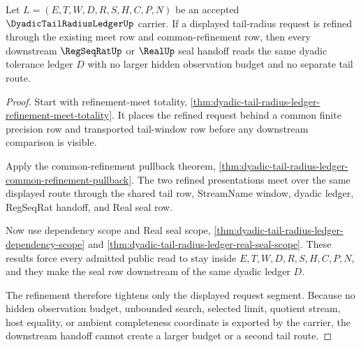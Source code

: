 \begin{theorem}
\label{thm:dyadic-tail-radius-ledger-budget-monotonicity}
Let $L=(E,T,W,D,R,S,H,C,P,N)$ be an accepted $\DyadicTailRadiusLedgerUp$ carrier. If a displayed tail-radius request is refined through the existing meet row and common-refinement row, then every downstream $\RegSeqRatUp$ or $\RealUp$ seal handoff reads the same dyadic tolerance ledger $D$ with no larger hidden observation budget and no separate tail route.
\end{theorem}
\begin{proof}
Start with refinement-meet totality, \autoref{thm:dyadic-tail-radius-ledger-refinement-meet-totality}. It places the refined request behind a common finite precision row and transported tail-window row before any downstream comparison is visible.

Apply the common-refinement pullback theorem, \autoref{thm:dyadic-tail-radius-ledger-common-refinement-pullback}. The two refined presentations meet over the same displayed route through the shared tail row, StreamName window, dyadic ledger, RegSeqRat handoff, and Real seal row.

Now use dependency scope and Real seal scope, \autoref{thm:dyadic-tail-radius-ledger-dependency-scope} and \autoref{thm:dyadic-tail-radius-ledger-real-seal-scope}. These results force every admitted public read to stay inside $E,T,W,D,R,S,H,C,P,N$, and they make the seal row downstream of the same dyadic ledger $D$.

The refinement therefore tightens only the displayed request segment. Because no hidden observation budget, unbounded search, selected limit, quotient stream, host equality, or ambient completeness coordinate is exported by the carrier, the downstream handoff cannot create a larger budget or a second tail route.
\end{proof}

